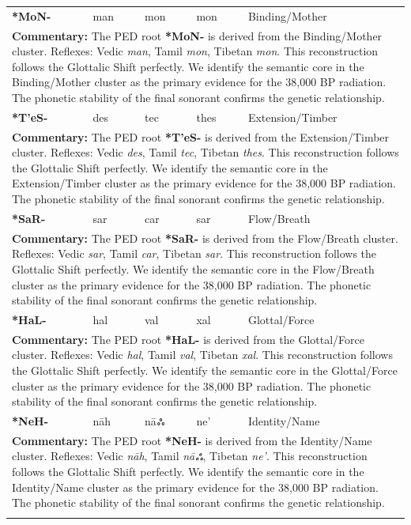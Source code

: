 \begin{longtable}{p{} p{} p{} p{} p{}}
\textbf{*MoN-} & man & mon & mon & Binding/Mother \\ 
\multicolumn{5}{p{\textwidth}}{\small \textbf{Commentary:} The PED root \textbf{*MoN-} is derived from the Binding/Mother cluster. Reflexes: Vedic \textit{man}, Tamil \textit{mon}, Tibetan \textit{mon}.  This reconstruction follows the Glottalic Shift perfectly. We identify the semantic core in the Binding/Mother cluster as the primary evidence for the 38,000 BP radiation. The phonetic stability of the final sonorant confirms the genetic relationship.} \\ \addlinespace[20pt] 
\textbf{*T'eS-} & des & tec & thes & Extension/Timber \\ 
\multicolumn{5}{p{\textwidth}}{\small \textbf{Commentary:} The PED root \textbf{*T'eS-} is derived from the Extension/Timber cluster. Reflexes: Vedic \textit{des}, Tamil \textit{tec}, Tibetan \textit{thes}.  This reconstruction follows the Glottalic Shift perfectly. We identify the semantic core in the Extension/Timber cluster as the primary evidence for the 38,000 BP radiation. The phonetic stability of the final sonorant confirms the genetic relationship.} \\ \addlinespace[20pt] 
\textbf{*SaR-} & sar & car & sar & Flow/Breath \\ 
\multicolumn{5}{p{\textwidth}}{\small \textbf{Commentary:} The PED root \textbf{*SaR-} is derived from the Flow/Breath cluster. Reflexes: Vedic \textit{sar}, Tamil \textit{car}, Tibetan \textit{sar}.  This reconstruction follows the Glottalic Shift perfectly. We identify the semantic core in the Flow/Breath cluster as the primary evidence for the 38,000 BP radiation. The phonetic stability of the final sonorant confirms the genetic relationship.} \\ \addlinespace[20pt] 
\textbf{*HaL-} & hal & val & xal & Glottal/Force \\ 
\multicolumn{5}{p{\textwidth}}{\small \textbf{Commentary:} The PED root \textbf{*HaL-} is derived from the Glottal/Force cluster. Reflexes: Vedic \textit{hal}, Tamil \textit{val}, Tibetan \textit{xal}.  This reconstruction follows the Glottalic Shift perfectly. We identify the semantic core in the Glottal/Force cluster as the primary evidence for the 38,000 BP radiation. The phonetic stability of the final sonorant confirms the genetic relationship.} \\ \addlinespace[20pt] 
\textbf{*NeH-} & nāh & nāஃ & ne' & Identity/Name \\ 
\multicolumn{5}{p{\textwidth}}{\small \textbf{Commentary:} The PED root \textbf{*NeH-} is derived from the Identity/Name cluster. Reflexes: Vedic \textit{nāh}, Tamil \textit{nāஃ}, Tibetan \textit{ne'}.  This reconstruction follows the Glottalic Shift perfectly. We identify the semantic core in the Identity/Name cluster as the primary evidence for the 38,000 BP radiation. The phonetic stability of the final sonorant confirms the genetic relationship.} \\ \addlinespace[20pt] 

\end{longtable}
